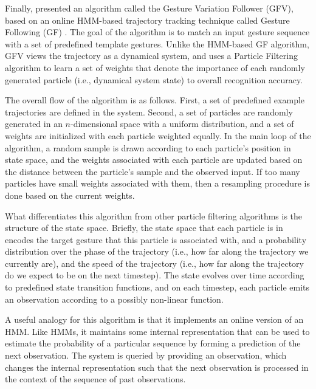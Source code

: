 
Finally, \citet{caramiaux2014}
presented an algorithm called the
Gesture Variation Follower (GFV),
based on an online HMM-based
trajectory tracking technique
called Gesture Following (GF)
\citep{bevilacqua2010,bevilacqua2011}.
The goal of the algorithm is to match
an input gesture sequence
with a set of predefined template gestures.
Unlike the HMM-based GF algorithm,
GFV views the trajectory as a dynamical system,
and uses a Particle Filtering algorithm
to learn a set of weights
that denote the importance of
each randomly generated particle
(i.e., dynamical system state)
to overall recognition accuracy.

The overall flow of the algorithm
is as follows.
First, a set of predefined example trajectories
are defined in the system.
Second, a set of particles
are randomly generated
in an $n$-dimensional space
with a uniform distribution,
and a set of weights are initialized
with each particle weighted equally.
In the main loop of the algorithm,
a random sample is drawn
according to each particle's position
in state space,
and the weights associated with each particle
are updated based on the distance
between the particle's sample
and the observed input.
If too many particles have small weights
associated with them,
then a resampling procedure is done
based on the current weights.

What differentiates this algorithm from
other particle filtering algorithms
is the structure of the state space.
Briefly, the state space that each particle is in
encodes the target gesture that this particle
is associated with,
and a probability distribution
over the phase of the trajectory
(i.e., how far along the trajectory
we currently are),
and the speed of the trajectory
(i.e., how far along the trajectory
do we expect to be on the next timestep).
The state evolves over time according to
predefined state transition functions,
and on each timestep,
each particle emits an observation
according to a possibly non-linear function.

A useful analogy for this algorithm
is that it implements an online version of an HMM.
Like HMMs, it maintains some internal representation
that can be used to estimate the probability
of a particular sequence
by forming a prediction
of the next observation.
The system is queried by providing
an observation,
which changes the internal representation
such that the next observation
is processed in the context of
the sequence of past observations.

